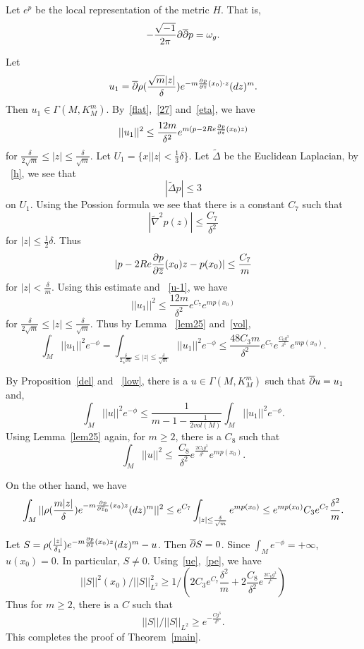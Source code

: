 Let $e^p$ be the local representation of the metric $H$. That is,
\[
-\frac{\sqrt{-1}}{2\pi}\partial\overline{\partial} p=\omega_g.
\]





Let 
\[
u_1=\overline{\partial}\rho(\frac{\sqrt m|z|}{\delta})
e^{-m\frac{\partial p}{\partial\overline z}(x_0)\cdot z} (dz)^m.
\] 
Then $u_1\in \Gamma(M,K_M^m)$. By~\eqref{flat},~\eqref{27}
and~\eqref{eta},
we have
\begin{equation}\label{u-1}
||u_1||^2\leq\frac{12m}{\delta^2}e^{m(p-2 Re\frac{\partial p}{\partial\overline z}
(x_0)z)}
\end{equation}
for $\frac{\delta}{2\sqrt{m}}\leq |z|\leq\frac{\delta}{\sqrt m}$. 
Let 
$U_1=\{x||z|<\frac 13\delta\}$.
Let $\tilde\Delta$ be the Euclidean Laplacian, by
~\eqref{h}, we see
that
\[
|\tilde\Delta p|\leq 3
\]
on $U_1$.
Using the Possion formula we see that there is a constant $C_7$ such that
\[
|\tilde\nabla^2 p(z)|\leq\frac{C_7}{\delta^2}
\]
for $|z|\leq\frac 12\delta$. Thus
\[
|p-2 Re\frac{\partial p}{\partial\overline z}(x_0) z
-p(x_0)|\leq\frac{C_7}{m}
\]
for $|z|<\frac{\delta}{m}$.
Using this estimate and ~\eqref{u-1}, we have
\[
||u_1||^2\leq\frac{12m}{\delta^2} e^{C_7} e^{mp(x_0)}
\]
for $\frac{\delta}{2\sqrt{m}}\leq |z|\leq\frac{\delta}{\sqrt m}$.
Thus by Lemma ~\ref{lem25} and~\eqref{vol},
\[
\int_M||u_1||^2 e^{-\phi}=\int_{\frac{\delta}{2\sqrt m}\leq |z|
\leq\frac{\delta}{\sqrt m}}||u_1||^2 e^{-\phi}
\leq \frac{48C_3 m}{\delta^2}
e^{C_7}
 e^{\frac{C_6g^{3}}{\delta^6}}
e^{m p(x_0)}.
\]

By Proposition~\ref{del} and ~\eqref{low}, there is a
$u\in\Gamma(M,K_M^m)$ such that
$\overline {\partial} u=u_1$ and,
\[
\int_M||u||^2 e^{-\phi}\leq\frac{1}{m-1-\frac{1}{2vol(M)}}
\int_M||u_1||^2 e^{-\phi}.
\]
Using Lemma~\ref{lem25} again, for $m\geq 2$, there is a $C_8$
such that
\begin{equation}\label{ue}
\int_M||u||^2\leq\
\frac{C_8}{\delta^2} e^{\frac{2C_6 g^{3}}{\delta^6}}
e^{mp(x_0)}.
\end{equation}

On the other hand, we have
\begin{equation}\label{pe}
\int_M||\rho(\frac{m|z|}{\delta}) 
e^{-m\frac{\partial p}{\partial\overline z_0}(x_0)z}
(dz)^m||^2
\leq e^{C_7}\int_{|z|\leq\frac{\delta}{\sqrt m}} e^{mp(x_0)}
\leq e^{mp(x_0)} C_3 e^{C_7}\frac{\delta^2}{m}.
\end{equation}

Let $S=\rho(\frac{|z|}{\delta_1})
e^{-m\frac{\partial p}{\partial\overline z}(x_0)z}
(dz)^m-u$. Then $\overline{\partial} S=0$.
Since
$\int_Me^{-\phi}=+\infty$, $u(x_0)=0$. In particular, $S\neq 0$. 
Using~\eqref{ue},~\eqref{pe}, we have
\[
||S||^2(x_0)/||S||^2_{L^2}\geq
1/\left (
2C_3e^{C_7}\frac{\delta^2}{m}+
2\frac{C_8}{\delta^2}e^{\frac{2C_6g^{3}}{\delta^6}}
\right)
\]
Thus for $m\geq 2$, there is
a $C$ such that
\[
||S||/||S||_{L^2}\geq e^{-\frac{Cg^3}{\delta^6}}.
\]
This completes the proof of Theorem~\ref{main}.
